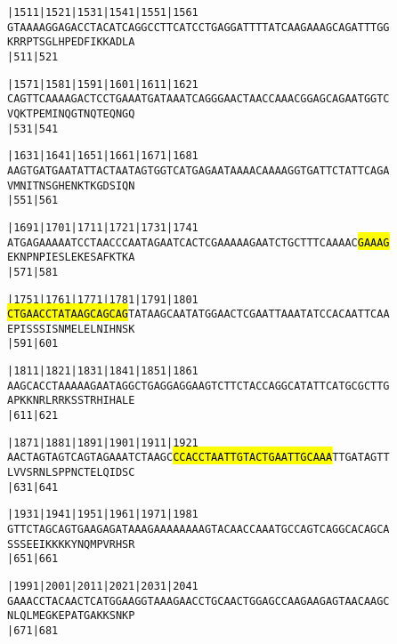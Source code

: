 \documentclass{article}
\begin{document}
\newpage
\begin{alltt}
|1511     |1521     |1531     |1541     |1551     |1561     
GTAAAAGGAGACCTACATCAGGCCTTCATCCTGAGGATTTTATCAAGAAAGCAGATTTGG
  K  R  R  P  T  S  G  L  H  P  E  D  F  I  K  K  A  D  L  A
                    |511                          |521      

|1571     |1581     |1591     |1601     |1611     |1621     
CAGTTCAAAAGACTCCTGAAATGATAAATCAGGGAACTAACCAAACGGAGCAGAATGGTC
  V  Q  K  T  P  E  M  I  N  Q  G  T  N  Q  T  E  Q  N  G  Q
                    |531                          |541      

|1631     |1641     |1651     |1661     |1671     |1681     
AAGTGATGAATATTACTAATAGTGGTCATGAGAATAAAACAAAAGGTGATTCTATTCAGA
  V  M  N  I  T  N  S  G  H  E  N  K  T  K  G  D  S  I  Q  N
                    |551                          |561      

|1691     |1701     |1711     |1721     |1731     |1741     
ATGAGAAAAATCCTAACCCAATAGAATCACTCGAAAAAGAATCTGCTTTCAAAAC\hl{GAAAG}
  E  K  N  P  N  P  I  E  S  L  E  K  E  S  A  F  K  T  K  A
                    |571                          |581      

|1751     |1761     |1771     |1781     |1791     |1801     
\hl{CTGAACCTATAAGCAGCAG}TATAAGCAATATGGAACTCGAATTAAATATCCACAATTCAA
  E  P  I  S  S  S  I  S  N  M  E  L  E  L  N  I  H  N  S  K
                    |591                          |601      

|1811     |1821     |1831     |1841     |1851     |1861     
AAGCACCTAAAAAGAATAGGCTGAGGAGGAAGTCTTCTACCAGGCATATTCATGCGCTTG
  A  P  K  K  N  R  L  R  R  K  S  S  T  R  H  I  H  A  L  E
                    |611                          |621      

|1871     |1881     |1891     |1901     |1911     |1921     
AACTAGTAGTCAGTAGAAATCTAAGC\hl{CCACCTAATTGTACTGAATTGCAAA}TTGATAGTT
  L  V  V  S  R  N  L  S  P  P  N  C  T  E  L  Q  I  D  S  C
                    |631                          |641      

|1931     |1941     |1951     |1961     |1971     |1981     
GTTCTAGCAGTGAAGAGATAAAGAAAAAAAAGTACAACCAAATGCCAGTCAGGCACAGCA
  S  S  S  E  E  I  K  K  K  K  Y  N  Q  M  P  V  R  H  S  R
                    |651                          |661      

|1991     |2001     |2011     |2021     |2031     |2041     
GAAACCTACAACTCATGGAAGGTAAAGAACCTGCAACTGGAGCCAAGAAGAGTAACAAGC
  N  L  Q  L  M  E  G  K  E  P  A  T  G  A  K  K  S  N  K  P
                    |671                          |681      

\end{alltt}
\end{document}

